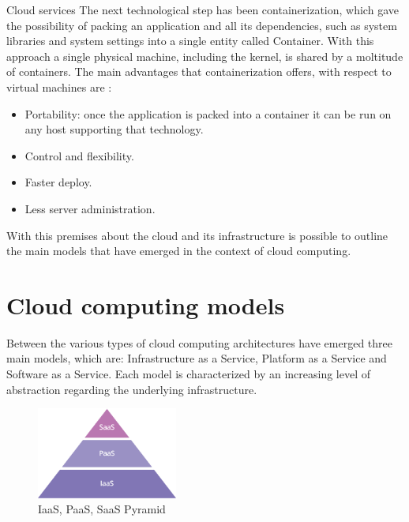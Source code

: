 \begin{chapter}{Cloud services}
    The next technological step has been containerization, which gave the possibility
    of packing an application and all its dependencies, such as system libraries
    and system settings into a single entity called Container. With this approach
    a single physical machine, including the kernel, is shared by a moltitude of
    containers. The main advantages that containerization offers, with respect to
    virtual machines are \cite{what_is_the_cloud}:
    \begin{itemize}
        \item Portability: once the application is packed into a container it can
            be run on any host supporting that technology.
        \item Control and flexibility.
        \item Faster deploy.
        \item Less server administration.
    \end{itemize}
    With this premises about the cloud and its infrastructure is possible to outline
    the main models that have emerged in the context of cloud computing.

    \section{Cloud computing models}
    Between the various types of cloud computing architectures have emerged three
    main models, which are: Infrastructure as a Service, Platform as a Service and
    Software as a Service. Each model is characterized by an increasing level of
    abstraction regarding the underlying infrastructure.

    \begin{figure}
        \centering
        \includegraphics[height=3cm]{source/images/saas-paas-iaas-cloud-pyramid.png}
        \caption{IaaS, PaaS, SaaS Pyramid}
        \label{fig:cloud_computing_pyramid}
    \end{figure}


\end{chapter}
